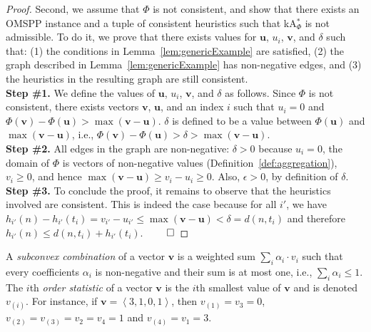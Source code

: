 \documentclass[smallextended]{svjour3}       %
\newcommand{\omspp}{\ac{OMSPP}\xspace}
\newcommand{\kastarphi}{\textup{kA}$^*_{\Phi}$\xspace}
\newcommand{\tuple}[1]{\ensuremath{\left \langle #1 \right \rangle }}
\newcommand{\axiomcons}{consistent\xspace}
\newcommand{\vect}[1]{\mathbf{#1}}
\begin{document}
\begin{proof}
  Second, we assume that $\Phi$ is not \axiomcons, and show that there exists an \omspp instance and a tuple of consistent heuristics such that \kastarphi is not admissible.
  To do it, we prove that there exists values for $\vect{u}$, $u_i$, $\vect{v}$, and $\delta$ such that: (1) the conditions in Lemma~\ref{lem:genericExample} are satisfied, (2) the graph described in Lemma~\ref{lem:genericExample} has non-negative edges, and (3) the heuristics in the resulting graph are still consistent.\\
  \noindent \textbf{Step \#1.} We define the values of $\vect{u}$, $u_i$, $\vect{v}$, and $\delta$ as follows.
  Since $\Phi$ is not \axiomcons, there exists vectors $\vect{v}$, $\vect{u}$, and an index $i$ such that $u_i = 0$ and $\Phi(\vect{v}) - \Phi(\vect{u}) > \max (\vect{v} - \vect{u})$. $\delta$ is defined to be a value between $\Phi(\vect{u})$ and $\max (\vect{v} - \vect{u})$, i.e., $\Phi(\vect{v}) - \Phi(\vect{u}) > \delta > \max (\vect{v} - \vect{u})$. \\
  \noindent \textbf{Step \#2.} All edges in the graph are non-negative:   $\delta>0$ because $u_i=0$, the domain of $\Phi$ is vectors of non-negative values (Definition~\ref{def:aggregation}), $v_i \geq 0$, and hence $\max (\vect{v} - \vect{u}) \geq v_i - u_i \geq 0$.
  Also, $\epsilon>0$, by definition of $\delta$. \\
  \noindent \textbf{Step \#3.}  To conclude the proof, it remains to observe that the heuristics involved are consistent.
  This is indeed the case because for all $i'$, we have $h_{i'}(n) - h_{i'}(t_i) = v_{i'} - u_{i'} \leq \max (\vect{v} - \vect{u}) < \delta = d(n, t_i)$ and therefore $h_{i'}(n) \leq d(n, t_i) + h_{i'}(t_i)$. $\qed$
\end{proof}

A \emph{subconvex combination} of a vector $\vect{v}$ is a weighted sum $\sum_i \alpha_i\cdot v_i$
such that every coefficients $\alpha_i$ is non-negative
and their sum is at most one, i.e., $\sum_i \alpha_i\leq 1$. 
The $i$th \emph{order statistic} of a vector $\vect{v}$ is the $i$th smallest value of $\vect{v}$ and is denoted $v_{(i)}$. 
For instance, if $\vect{v} = \tuple{3, 1, 0, 1}$, then $v_{(1)} = v_3 = 0$, $v_{(2)} = v_{(3)} = v_2 = v_4 = 1$ and $v_{(4)} = v_1 = 3$. 
\end{document}
